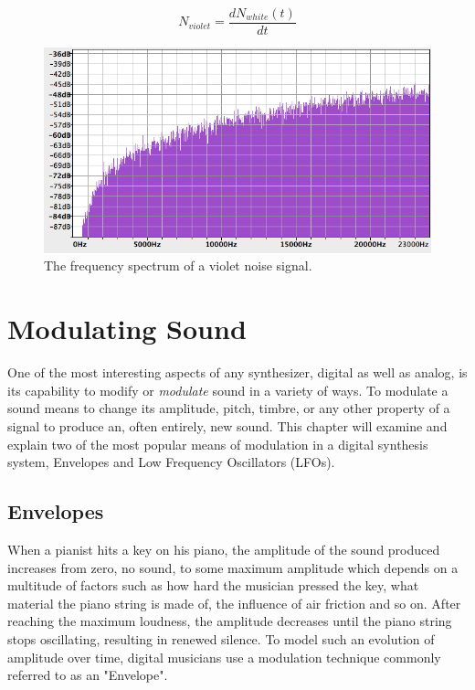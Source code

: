 \documentclass[12pt,twoside]{report}
\begin{document}
\begin{equation}
  N_{violet} = \frac{dN_{white}(t)}{dt}
  \label{eq:vnoise}
\end{equation}

\begin{figure}
  \includegraphics[scale=0.6]{img/vnoisef}
  \caption{The frequency spectrum of a violet noise signal.}
  \label{fig:vnoisef}
\end{figure}

\chapter{Modulating Sound}

One of the most interesting aspects of any synthesizer, digital as well as analog, is its capability to modify or \emph{modulate} sound in a variety of ways. To modulate a sound means to change its amplitude, pitch, timbre, or any other property of a signal to produce an, often entirely, new sound. This chapter will examine and explain two of the most popular means of modulation in a digital synthesis system, Envelopes and Low Frequency Oscillators (LFOs).

\section{Envelopes}

When a pianist hits a key on his piano, the amplitude of the sound produced increases from zero, no sound, to some maximum amplitude which depends on a multitude of factors such as how hard the musician pressed the key, what material the piano string is made of, the influence of air friction and so on. After reaching the maximum loudness, the amplitude decreases until the piano string stops oscillating, resulting in renewed silence. To model such an evolution of amplitude over time, digital musicians use a modulation technique commonly referred to as an "Envelope".
\end{document}
